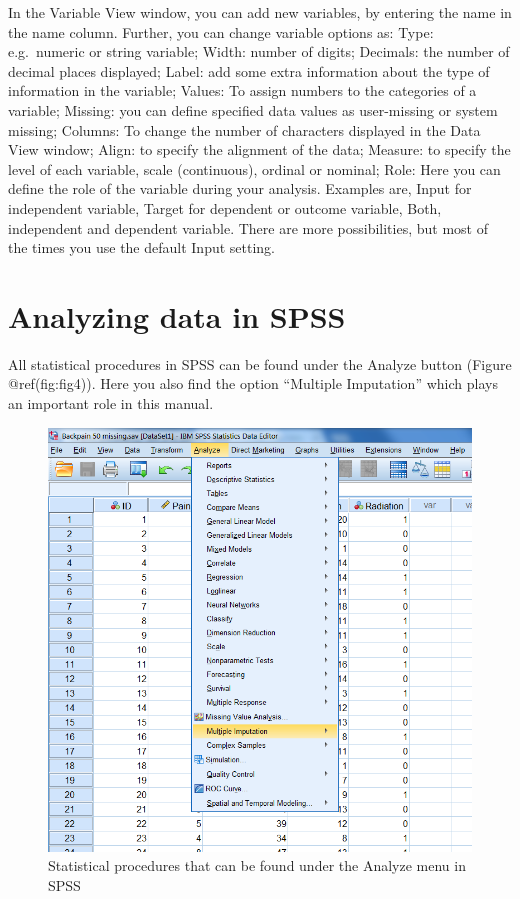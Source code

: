\documentclass[
]{book}
\begin{document}
In the Variable View window, you can add new variables, by entering the
name in the name column. Further, you can change variable options as:
Type: e.g.~numeric or string variable; Width: number of digits;
Decimals: the number of decimal places displayed; Label: add some extra
information about the type of information in the variable; Values: To
assign numbers to the categories of a variable; Missing: you can define
specified data values as user-missing or system missing; Columns: To
change the number of characters displayed in the Data View window;
Align: to specify the alignment of the data; Measure: to specify the
level of each variable, scale (continuous), ordinal or nominal; Role:
Here you can define the role of the variable during your analysis.
Examples are, Input for independent variable, Target for dependent or
outcome variable, Both, independent and dependent variable. There are
more possibilities, but most of the times you use the default Input
setting.

\hypertarget{analyzing-data-in-spss}{%
\section{Analyzing data in SPSS}\label{analyzing-data-in-spss}}

All statistical procedures in SPSS can be found under the Analyze button
(Figure @ref(fig:fig4)). Here you also find the option ``Multiple
Imputation'' which plays an important role in this manual.

\begin{figure}

{\centering \includegraphics[width=0.95\linewidth]{images/fig1.4} 

}

\caption{Statistical procedures that can be found under the Analyze menu in SPSS}\label{fig:fig4}
\end{figure}
\end{document}
